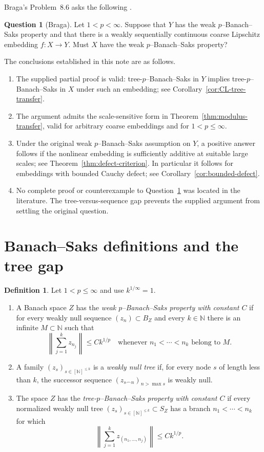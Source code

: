 \documentclass[11pt]{amsart}
\theoremstyle{definition}
\newtheorem{definition}[theorem]{Definition}
\newtheorem{question}[theorem]{Question}
\theoremstyle{remark}
\newcommand{\N}{\mathbb N}
\newcommand{\norm}[1]{\left\lVert #1\right\rVert}
\begin{document}
Braga's Problem~8.6 asks the following \cite[Problem~8.6]{BragaJIMJ}.

\begin{question}[Braga]\label{q:Braga}
Let $1<p<\infty$.  Suppose that $Y$ has the weak $p$--Banach--Saks property and that there is a weakly sequentially continuous coarse Lipschitz embedding $f:X\to Y$.  Must $X$ have the weak $p$--Banach--Saks property?
\end{question}

The conclusions established in this note are as follows.
\begin{enumerate}[label=\textup{(\roman*)}]
 \item The supplied partial proof is valid: tree-$p$--Banach--Saks in $Y$ implies tree-$p$--Banach--Saks in $X$ under such an embedding; see Corollary~\ref{cor:CL-tree-transfer}.
 \item The argument admits the scale-sensitive form in Theorem~\ref{thm:modulus-transfer}, valid for arbitrary coarse embeddings and for $1<p\le\infty$.
 \item Under the original weak $p$--Banach--Saks assumption on $Y$, a positive answer follows if the nonlinear embedding is sufficiently additive at suitable large scales; see Theorem~\ref{thm:defect-criterion}.  In particular it follows for embeddings with bounded Cauchy defect; see Corollary~\ref{cor:bounded-defect}.
 \item No complete proof or counterexample to Question~\ref{q:Braga} was located in the literature.  The tree-versus-sequence gap prevents the supplied argument from settling the original question.
\end{enumerate}

\section{Banach--Saks definitions and the tree gap}

\begin{definition}
Let $1<p\le\infty$ and use $k^{1/\infty}=1$.
\begin{enumerate}[label=\textup{(\roman*)}]
 \item A Banach space $Z$ has the \emph{weak $p$--Banach--Saks property with constant $C$} if for every weakly null sequence $(z_n)\subset B_Z$ and every $k\in\N$ there is an infinite $M\subset\N$ such that
 \[
  \norm{\sum_{j=1}^k z_{n_j}}\le Ck^{1/p}
  \quad\text{whenever }n_1<\cdots<n_k\text{ belong to }M.
 \]
 \item A family $(z_s)_{s\in[\N]^{\le k}}$ is a \emph{weakly null tree} if, for every node $s$ of length less than $k$, the successor sequence $(z_{s\frown n})_{n>\max s}$ is weakly null.
 \item The space $Z$ has the \emph{tree-$p$--Banach--Saks property with constant $C$} if every normalized weakly null tree $(z_s)_{s\in[\N]^{\le k}}\subset S_Z$ has a branch $n_1<\cdots<n_k$ for which
 \[
  \norm{\sum_{j=1}^k z_{(n_1,\ldots,n_j)}}\le Ck^{1/p}.
 \]
\end{enumerate}
\end{definition}
\end{document}
